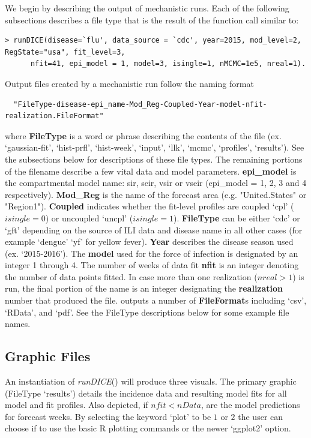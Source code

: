\documentclass[a4paper]{article}
\begin{document}
We begin by describing the output of mechanistic runs.  Each of the following subsections describes a file type that is the result of the function call similar to:
\begin{verbatim}
> runDICE(disease=`flu', data_source = `cdc', year=2015, mod_level=2, RegState="usa", fit_level=3,
      nfit=41, epi_model = 1, model=3, isingle=1, nMCMC=1e5, nreal=1).
\end{verbatim}

Output files created by a mechanistic  run follow the naming format
\begin{verbatim}
  "FileType-disease-epi_name-Mod_Reg-Coupled-Year-model-nfit-realization.FileFormat"
\end{verbatim}
where \textbf{FileType} is a word or phrase describing the contents of the file (ex. `gaussian-fit', `hist-prfl', `hist-week', `input', `llk', `mcmc', `profiles', `results').  See the subsections below for descriptions of these file types.  The remaining portions of the filename describe a few vital data and model parameters. \textbf{epi\_model} is the compartmental model name: sir, seir, vsir or vseir (epi\_model = 1, 2, 3 and 4 respectively).  \textbf{Mod\_Reg} is the name of the forecast area (e.g. "United.States" or "Region1"). \textbf{Coupled} indicates whether the fit-level profiles are coupled `cpl' ($isingle=0$) or uncoupled `uncpl' ($isingle=1$).  \textbf{FileType} can be either `cdc' or `gft' depending on the source of ILI data and disease name in all other cases (for example `dengue' `yf' for yellow fever).  \textbf{Year} describes the disease season used (ex. `2015-2016').  The \textbf{model} used for the force of infection is designated by an integer 1 through 4.  The number of weeks of data fit \textbf{nfit} is an integer denoting the number of data points fitted.  In case more than one realization ($nreal>1$) is run, the final portion of the name is an integer designating the \textbf{realization} number that produced the file.   outputs a number of \textbf{FileFormat}s including `csv', `RData', and `pdf'.  See the FileType descriptions below for some example file names.


\subsection{Graphic Files}
An instantiation of \textit{runDICE}() will produce three visuals.  The primary graphic (FileType `results') details the incidence data and resulting model fits for all model and fit profiles.  Also depicted, if $nfit < nData$, are the model predictions for forecast weeks. By selecting the keyword `plot' to be $1$ or $2$ the user can choose if to use the basic R plotting commands or the newer `ggplot2' option.
\end{document}
